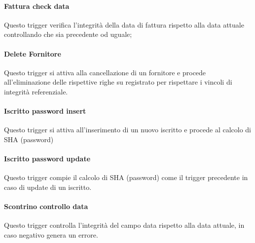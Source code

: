 

\paragraph*{Fattura check data}

Questo trigger verifica l'integrit\`a della data di fattura rispetto alla data attuale controllando che sia precedente od uguale;



\paragraph*{Delete Fornitore}

Questo trigger si attiva alla cancellazione di un fornitore e procede all'eliminazione delle rispettive righe su registrato per rispettare i vincoli di integrit\`a referenziale. \newpage



\paragraph*{Iscritto password insert}

Questo trigger si attiva all'inserimento di un nuovo iscritto e procede al calcolo di SHA (password)



\paragraph*{Iscritto password update}

Questo trigger compie il calcolo di SHA (password) come il trigger precedente in caso di update di un iscritto.



\paragraph*{Scontrino controllo data}

Questo trigger controlla l'integrit\`a del campo data rispetto alla data attuale, in caso negativo genera un errore.

